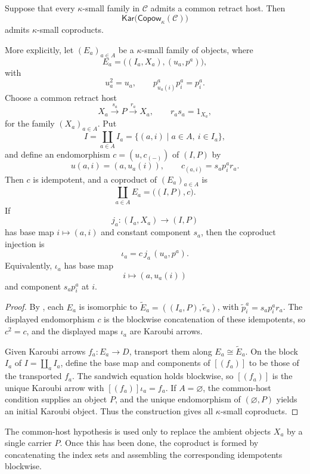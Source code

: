 \documentclass[runningheads,envcountsame]{llncs}
\newcommand{\Copow}{\mathsf{Copow}}
\newcommand{\Kar}{\mathsf{Kar}}
\begin{document}
\begin{proposition}
	\label{prop:kar-coprod}
	Suppose that every $\kappa$-small family in $\mathcal C$ admits a common
	retract host. Then
	$$
	\Kar\bigl(\Copow_\kappa(\mathcal C)\bigr)
	$$
	admits $\kappa$-small coproducts.
	
	More explicitly, let $(E_a)_{a\in A}$ be a $\kappa$-small family of objects,
	where
	$$
	E_a=\bigl((I_a,X_a),(u_a,p^a)\bigr),
	$$
	with
	$$
	u_a^2=u_a,
	\qquad
	p^a_{u_a(i)}p^a_i=p^a_i.
	$$
	Choose a common retract host
	$$
	X_a\xrightarrow{s_a}P\xrightarrow{r_a}X_a,
	\qquad
	r_as_a=1_{X_a},
	$$
	for the family $(X_a)_{a\in A}$. Put
	$$
	I=\coprod_{a\in A}I_a
	=
	\{(a,i)\mid a\in A,\ i\in I_a\},
	$$
	and define an endomorphism $c=(u,c_{(-)})$ of $(I,P)$ by
	$$
	u(a,i)=(a,u_a(i)),
	\qquad
	c_{(a,i)}=s_ap^a_ir_a.
	$$
	Then $c$ is idempotent, and a coproduct of $(E_a)_{a\in A}$ is
	$$
	\coprod_{a\in A}E_a
	=
	\bigl((I,P),c\bigr).
	$$
	If
	$$
	j_a:(I_a,X_a)\longrightarrow(I,P)
	$$
	has base map $i\mapsto(a,i)$ and constant component $s_a$, then the
	coproduct injection is
	$$
	\iota_a=c\,j_a\,(u_a,p^a).
	$$
	Equivalently, $\iota_a$ has base map
	$$
	i\longmapsto(a,u_a(i))
	$$
	and component $s_ap^a_i$ at $i$.
\end{proposition}


\begin{proof}
By , each $E_a$ is isomorphic to
$\widetilde E_a=((I_a,P),\widetilde e_a)$, with
$\widetilde p^a_i=s_ap^a_ir_a$. The displayed endomorphism $c$ is the
blockwise concatenation of these idempotents, so $c^2=c$, and the displayed
maps $\iota_a$ are Karoubi arrows.

Given Karoubi arrows $f_a:E_a\to D$, transport them along
$E_a\cong\widetilde E_a$. On the block $I_a$ of
$I=\coprod_a I_a$, define the base map and components of $[(f_a)]$ to be
those of the transported $f_a$. The sandwich equation holds blockwise, so
$[(f_a)]$ is the unique Karoubi arrow with $[(f_a)]\iota_a=f_a$. If
$A=\varnothing$, the common-host condition supplies an object $P$, and the
unique endomorphism of $(\varnothing,P)$ yields an initial Karoubi object.
Thus the construction gives all $\kappa$-small coproducts.
\end{proof}



The common-host hypothesis is used only to replace the ambient objects
$X_a$ by a single carrier $P$. Once this has been done, the coproduct is formed
by concatenating the index sets and assembling the corresponding idempotents
blockwise. 
\end{document}
